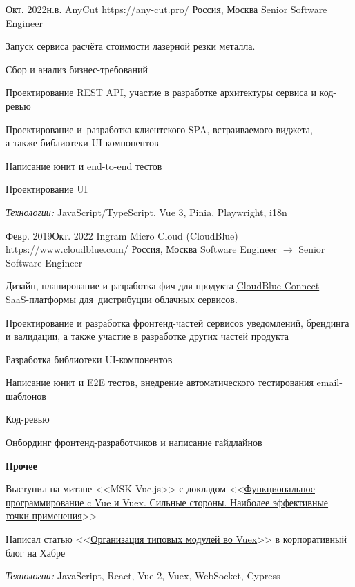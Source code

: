 \documentclass[10pt]{article}
\begin{document}
\job
	{Окт. 2022}{н.в.}
	{AnyCut}
	{https://any-cut.pro/}
	{Россия, Москва}
	{Senior Software Engineer}
	{
	  Запуск сервиса расчёта стоимости лазерной резки металла.

	  \begin{supercompactitemize}
	  	\item Сбор и анализ бизнес-требований
		\item Проектирование REST API, участие в разработке архитектуры сервиса и код-ревью
		\item Проектирование и~разработка клиентского SPA, встраиваемого виджета, \\
		  а также библиотеки UI-компонентов
		\item Написание юнит и end-to-end тестов
		\item Проектирование UI
	  \end{supercompactitemize}

	  \textit{Технологии:} JavaScript/TypeScript, Vue 3, Pinia, Playwright, i18n
	}

\job
	{Февр. 2019}{Окт. 2022}
	{Ingram Micro Cloud (CloudBlue)}
	{https://www.cloudblue.com/}
	{Россия, Москва}
	{Software Engineer $\rightarrow$ Senior Software Engineer}
	{
	  Дизайн, планирование и разработка фич для продукта \href{https://connect.cloudblue.com/community/}{CloudBlue Connect} --- SaaS-платформы для~дистрибуции облачных сервисов.

	  \begin{supercompactitemize}
	  	\item Проектирование и разработка фронтенд-частей сервисов уведомлений, брендинга и валидации, а также участие в разработке других частей продукта
		\item Разработка библиотеки UI-компонентов
		\item Написание юнит и E2E тестов, внедрение автоматического тестирования email-шаблонов
		\item Код-ревью
		\item Онбординг фронтенд-разработчиков и написание гайдлайнов
	  \end{supercompactitemize}

	  \textbf{Прочее}

	  \begin{supercompactitemize}
	  	\item Выступил на митапе <<MSK Vue.js>> с докладом <<\href{https://www.youtube.com/watch?v=Rz_RynHNZKg}{Функциональное программирование c Vue и Vuex. Сильные стороны. Наиболее эффективные точки применения}>>
		\item Написал статью <<\href{https://habr.com/ru/company/odin_ingram_micro/blog/526094/}{Организация типовых модулей во Vuex}>> в корпоративный блог на Хабре
	  \end{supercompactitemize}

	  \textit{Технологии:} JavaScript, React, Vue 2, Vuex, WebSocket, Cypress
	}
\end{document}
